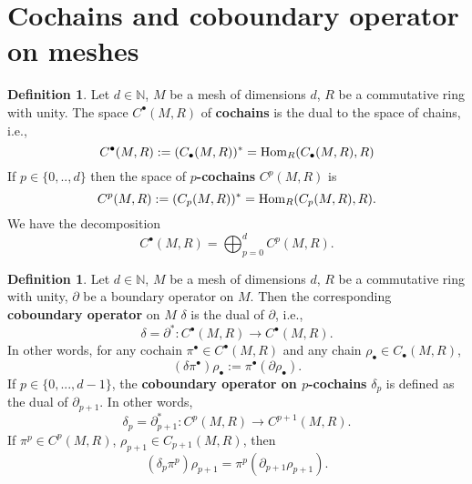 \documentclass[fleqn]{article}
\theoremstyle{definition}
\newtheorem{definition}[theorem]{Definition}
\begin{document}
\section{Cochains and coboundary operator on meshes}

\begin{definition}
  Let
    $d \in \mathbb{N}$,
    $M$ be a mesh of dimensions $d$,
    $R$ be a commutative ring with unity.
  The space $C^\bullet(M, R)$ of \textbf{cochains} is the dual to the space of
  chains, i.e.,
  \begin{equation}
    C^\bullet(M, R) := (C_\bullet(M, R))^* = {\rm Hom}_R(C_\bullet(M, R), R)
  \end{equation}
  If $p \in \{0, .., d\}$ then the space of \textbf{$p$-cochains} $C^p(M, R)$ is
  \begin{equation}
    C^p(M, R) := (C_p(M, R))^* = {\rm Hom}_R(C_p(M, R), R).
  \end{equation}
  We have the decomposition
  \begin{equation}
    C^\bullet(M, R) = \bigoplus_{p = 0}^d C^p(M, R).
  \end{equation}
\end{definition}

\begin{definition}
  Let
    $d \in \mathbb{N}$,
    $M$ be a mesh of dimensions $d$,
    $R$ be a commutative ring with unity,
    $\partial$ be a boundary operator on $M$.
  Then the corresponding \textbf{coboundary operator} on $M$ $\delta$ is the
  dual of $\partial$, i.e.,
  \begin{equation}
    \delta = \partial^* \colon C^\bullet(M, R) \to C^\bullet(M, R).
  \end{equation}
  In other words, for any cochain $\pi^\bullet \in C^\bullet(M, R)$ and any
  chain $\rho_\bullet \in C_\bullet(M, R)$,
  \begin{equation}
    (\delta \pi^\bullet) \rho_\bullet := \pi^\bullet(\partial \rho_\bullet).
  \end{equation}
  If $p \in \{0, ..., d - 1\}$, the \textbf{coboundary operator on $p$-cochains}
  $\delta_p$ is defined as the dual of $\partial_{p + 1}$.
  In other words,
  \begin{equation}
    \delta_p = \partial_{p + 1}^* \colon C^p(M, R) \to C^{p + 1}(M, R).
  \end{equation}
  If $\pi^p \in C^p(M, R)$, $\rho_{p + 1} \in C_{p + 1}(M, R)$, then
  \begin{equation}
    (\delta_p \pi^p) \rho_{p + 1} = \pi^p(\partial_{p + 1} \rho_{p + 1}).
  \end{equation}
\end{definition}
\end{document}
